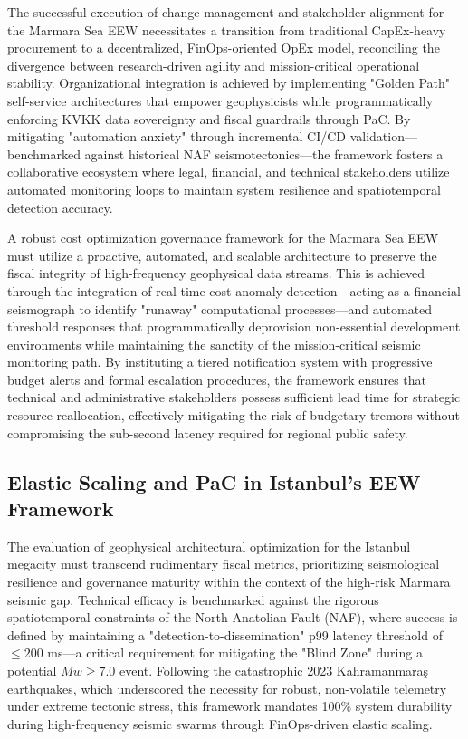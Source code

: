 \documentclass[data,article,submit,pdftex,moreauthors]{Definitions/mdpi}
\begin{document}
The successful execution of change management and stakeholder alignment for the Marmara Sea EEW necessitates a transition from traditional CapEx-heavy procurement to a decentralized, FinOps-oriented OpEx model, reconciling the divergence between research-driven agility and mission-critical operational stability. Organizational integration is achieved by implementing "Golden Path" self-service architectures that empower geophysicists while programmatically enforcing KVKK data sovereignty and fiscal guardrails through PaC. By mitigating "automation anxiety" through incremental CI/CD validation—benchmarked against historical NAF seismotectonics—the framework fosters a collaborative ecosystem where legal, financial, and technical stakeholders utilize automated monitoring loops to maintain system resilience and spatiotemporal detection accuracy.

A robust cost optimization governance framework for the Marmara Sea EEW must utilize a proactive, automated, and scalable architecture to preserve the fiscal integrity of high-frequency geophysical data streams. This is achieved through the integration of real-time cost anomaly detection—acting as a financial seismograph to identify "runaway" computational processes—and automated threshold responses that programmatically deprovision non-essential development environments while maintaining the sanctity of the mission-critical seismic monitoring path. By instituting a tiered notification system with progressive budget alerts and formal escalation procedures, the framework ensures that technical and administrative stakeholders possess sufficient lead time for strategic resource reallocation, effectively mitigating the risk of budgetary tremors without compromising the sub-second latency required for regional public safety.

\subsection{Elastic Scaling and PaC in Istanbul’s EEW Framework}
The evaluation of geophysical architectural optimization for the Istanbul megacity must transcend rudimentary fiscal metrics, prioritizing seismological resilience and governance maturity within the context of the high-risk Marmara seismic gap. Technical efficacy is benchmarked against the rigorous spatiotemporal constraints of the North Anatolian Fault (NAF), where success is defined by maintaining a "detection-to-dissemination" p99 latency threshold of $\leq 200$ ms—a critical requirement for mitigating the "Blind Zone" during a potential $Mw \geq 7.0$ event. Following the catastrophic 2023 Kahramanmaraş earthquakes, which underscored the necessity for robust, non-volatile telemetry under extreme tectonic stress, this framework mandates 100\% system durability during high-frequency seismic swarms through FinOps-driven elastic scaling.
\end{document}
